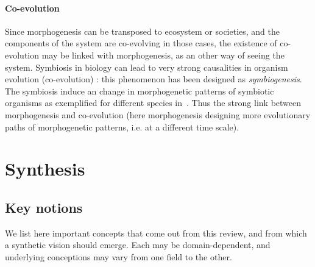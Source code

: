 \documentclass[fleqn,10pt]{wlscirep}
\begin{document}
\paragraph{Co-evolution}

Since morphogenesis can be transposed to ecosystem or societies, and the components of the system are co-evolving in those cases, the existence of co-evolution may be linked with morphogenesis, as an other way of seeing the system. Symbiosis in biology can lead to very strong causalities in organism evolution (co-evolution) : this phenomenon has been designed as \emph{symbiogenesis}. The symbiosis induce an change in morphogenetic patterns of symbiotic organisms as exemplified for different species in~\cite{chapman1998morphogenesis}. Thus the strong link between morphogenesis and co-evolution (here morphogenesis designing more evolutionary paths of morphogenetic patterns, i.e. at a different time scale).






\section*{Synthesis}

\subsection*{Key notions}

We list here important concepts that come out from this review, and from which a synthetic vision should emerge. Each may be domain-dependent, and underlying conceptions may vary from one field to the other.
\end{document}
